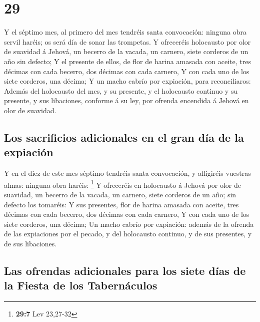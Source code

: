 \hypertarget{section-28}{%
\section{29}\label{section-28}}

 Y el séptimo mes, al primero del mes tendréis santa
convocación: ninguna obra servil haréis; os será día de sonar las
trompetas.  Y ofreceréis holocausto por olor de suavidad á
Jehová, un becerro de la vacada, un carnero, siete corderos de un año
sin defecto;  Y el presente de ellos, de flor de harina
amasada con aceite, tres décimas con cada becerro, dos décimas con cada
carnero,  Y con cada uno de los siete corderos, una décima;
 Y un macho cabrío por expiación, para reconciliaros:
 Además del holocausto del mes, y su presente, y el
holocausto continuo y su presente, y sus libaciones, conforme á su ley,
por ofrenda encendida á Jehová en olor de suavidad.

\hypertarget{los-sacrificios-adicionales-en-el-gran-duxeda-de-la-expiaciuxf3n}{%
\subsection{Los sacrificios adicionales en el gran día de la
expiación}\label{los-sacrificios-adicionales-en-el-gran-duxeda-de-la-expiaciuxf3n}}

 Y en el diez de este mes séptimo tendréis santa
convocación, y afligiréis vuestras almas: ninguna obra haréis:
\footnote{\textbf{29:7} Lev 23,27-32}  Y ofreceréis en
holocausto á Jehová por olor de suavidad, un becerro de la vacada, un
carnero, siete corderos de un año; sin defecto los tomaréis:
 Y sus presentes, flor de harina amasada con aceite, tres
décimas con cada becerro, dos décimas con cada carnero,  Y
con cada uno de los siete corderos, una décima;  Un macho
cabrío por expiación: además de la ofrenda de las expiaciones por el
pecado, y del holocausto continuo, y de sus presentes, y de sus
libaciones.

\hypertarget{las-ofrendas-adicionales-para-los-siete-duxedas-de-la-fiesta-de-los-tabernuxe1culos}{%
\subsection{Las ofrendas adicionales para los siete días de la Fiesta de
los
Tabernáculos}\label{las-ofrendas-adicionales-para-los-siete-duxedas-de-la-fiesta-de-los-tabernuxe1culos}}

